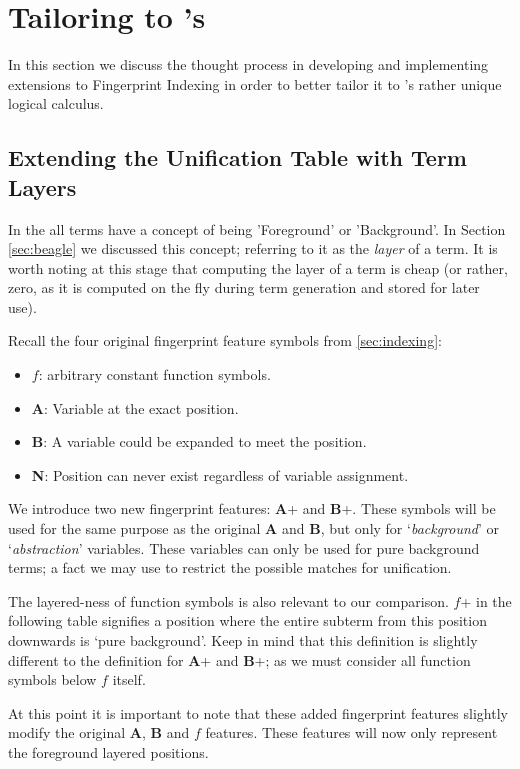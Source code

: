 \section{Tailoring to \Beagle's \HSWA}
\label{sec:tailored}

In this section we discuss the thought process in developing and implementing
extensions to Fingerprint Indexing in order to better tailor it to \beagle's
rather unique logical calculus.

\subsection{Extending the Unification Table with Term Layers}

In the {\HSWA} all terms have 
a concept of being 'Foreground' or 'Background'. In Section \ref{sec:beagle} we
discussed this concept; referring to it as the \emph{layer} of a term. It is
worth noting at this stage that computing the layer of a term is cheap (or rather,
zero, as it is computed on the fly during term generation and stored for later use).

Recall the four original fingerprint feature symbols from \ref{sec:indexing}:
\begin{itemize}
\item $f$: arbitrary constant function symbols.
\item \textbf{A}: Variable at the exact position.
\item \textbf{B}: A variable could be expanded to meet the position.
\item \textbf{N}: Position can never exist regardless of variable assignment.
\end{itemize}
We introduce two new fingerprint features: \textbf{A}+ and \textbf{B}+.
These symbols will be used for the same purpose as the original \textbf{A} and \textbf{B}, but
only for `\emph{background}' or `\emph{abstraction}' variables. These variables
can only be used for pure background terms; a fact we may use to restrict the possible
matches for unification.

The layered-ness of function symbols is also relevant to our comparison.
$f$+ in the following table signifies a position where the entire subterm from this position downwards
is `pure background'. Keep in mind that this definition is slightly different
to the definition for \textbf{A}+ and \textbf{B}+; as we must consider all function
symbols below $f$ itself.

At this point it is important to note that these added fingerprint features slightly modify
the original \textbf{A}, \textbf{B} and $f$ features. These features will now
only represent the foreground layered positions.


